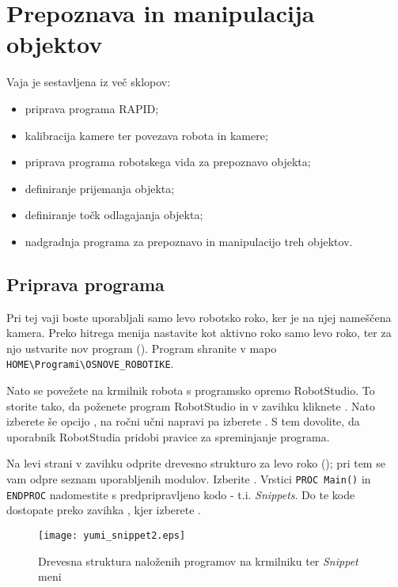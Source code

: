 \section{Prepoznava in manipulacija objektov}

Vaja je sestavljena iz več sklopov:
\begin{itemize}
	\item priprava programa RAPID;
	\item kalibracija kamere ter povezava robota in kamere;
	\item priprava programa robotskega vida za prepoznavo objekta;
	\item definiranje prijemanja objekta;
	\item definiranje točk odlagajanja objekta;
	\item nadgradnja programa za prepoznavo in manipulacijo treh objektov.
\end{itemize}

\subsection{Priprava programa}

Pri tej vaji boste uporabljali samo levo robotsko roko, ker je na njej nameščena kamera. Preko hitrega menija nastavite kot aktivno roko samo levo roko, ter za njo ustvarite nov program (). Program shranite v mapo \verb"HOME\Programi\OSNOVE_ROBOTIKE".

Nato se povežete na krmilnik robota s programsko opremo RobotStudio. To storite tako, da poženete program RobotStudio in v zavihku  kliknete . Nato izberete še opcijo , na ročni učni napravi pa izberete . S tem dovolite, da uporabnik RobotStudia pridobi pravice za spreminjanje programa.

Na levi strani v zavihku  odprite drevesno strukturo za levo roko (); pri tem se vam odpre seznam uporabljenih modulov. Izberite . Vrstici \verb"PROC Main()" in \verb"ENDPROC" nadomestite s predpripravljeno kodo - t.i. \emph{Snippets}. Do te kode dostopate preko zavihka , kjer izberete .

\begin{figure}[!hbt]
	\centering
	\texttt{[image: yumi\_snippet2.eps]}
	\caption{Drevesna struktura naloženih programov na krmilniku ter \emph{Snippet} meni}
	\label{fig:yumi_snippet}
\end{figure}

